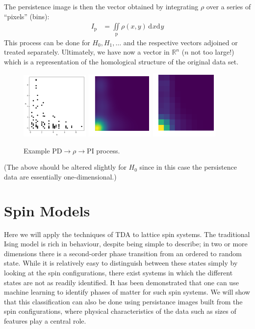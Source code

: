 \documentclass[11pt]{article}
\renewcommand{\d}[2][]{\mathrm{d}^{#1}{#2}}
\begin{document}
The persistence image is then the vector obtained by integrating $\rho$ over a series of ``pixels'' (bins):
\begin{align}
    I_\text{p} &= \iint\limits_\text{p}\rho(x,y)\,\d{x}\d{y}
\end{align}
This process can be done for $H_0,H_1,\ldots$ and the respective vectors adjoined or treated separately. Ultimately, we have now a vector in $\mathbb{R}^n$ ($n$ not too large!) which is a representation of the homological structure of the original data set.

\begin{figure}[b]
    \centering
    \includegraphics[width=0.3\textwidth]{pd_example}
    \includegraphics[width=0.3\textwidth]{rho_example}
    \includegraphics[width=0.3\textwidth]{pi_example}
    \caption{Example PD$\rightarrow\rho\rightarrow$PI process.}
\end{figure}

(The above should be altered slightly for $H_0$ since in this case the persistence data are essentially one-dimensional.)


\section{Spin Models}
Here we will apply the techniques of TDA to lattice spin systems. The traditional Ising model is rich in behaviour, despite being simple to describe; in two or more dimensions there is a second-order phase transition from an ordered to random state. While it is relatively easy to distinguish between these states simply by looking at the spin configurations, there exist systems in which the different states are not as readily identified. It has been demonstrated that one can use machine learning to identify phases of matter for such spin systems. We will show that this classification can also be done using persistance images built from the spin configurations, where physical characteristics of the data such as sizes of features play a central role.
\end{document}
